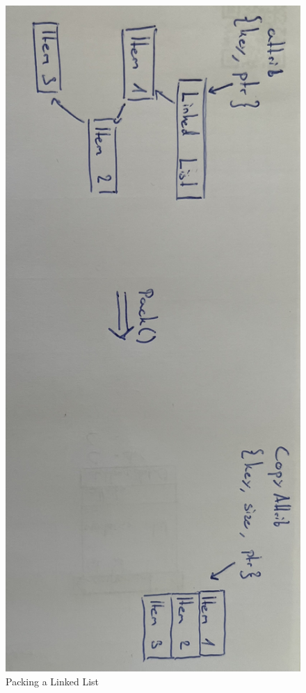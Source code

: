\begin{figure}[!ht] %
    \includegraphics[scale=0.1, angle=90]{images/packing.jpg} %
    \centering
    \caption{Packing a Linked List}
    \label{figure:packing_example}
\end{figure}

